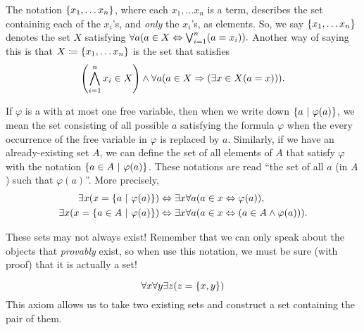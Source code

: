 \begin{definition}\label{not:setbuilder}
    The notation \(\set*{x_1, \dots x_n}\),
    where each \(x_1, \dots x_n\) is a term, 
    describes the set containing each of the \(x_i\)'s, and \emph{only} the \(x_i\)'s, as elements.
    So, we say \(\set*{x_1, \dots x_n}\) denotes the set \(X\) satisfying
    \(
        \forall a \pn*{a \in X \iff \bigjoin_{i = 1}^{n}\pn*{a = x_i}}.
    \)
    Another way of saying this is that \(X \defn \set*{x_1, \dots x_n}\) is the set that satisfies
    \[
        \pn*{\bigmeet_{i = 1}^{n}x_i \in X}
             \meet \forall a \pn*{a \in X \implies \pn*{\exists x \in X \pn*{a = x}}}.
    \]
\end{definition}

\begin{definition}
    If \(\varphi\) is a {\wff} with at most one free variable,
    then when we write down \(\set*{a \suchthat \varphi(a)}\),
    we mean the set consisting of all possible \(a\) satisfying the formula \(\varphi\)
    when the every occurrence of the free variable in \(\varphi\) is replaced by \(a\).
    Similarly, if we have an already-existing set \(A\),
    we can define the set of all elements of \(A\) that satisfy \(\varphi\)
    with the notation \(\set*{a \in A \suchthat \varphi(a)}\).
    These notations are read ``the set of all \(a\) (in \(A\)) such that \(\varphi(a)\)''.
    More precisely,
    \begin{align*}
        \exists x \pn*{x = \set*{a \suchthat \varphi(a)}}
            &\iff \exists x \forall a \pn*{a \in x \iff \varphi(a)},\\
        \exists x \pn*{x = \set*{a  \in A \suchthat \varphi(a)}}
            &\iff \exists x \forall a \pn*{a \in x \iff \pn*{a \in A \meet \varphi(a)}}.
    \end{align*}

    \begin{note}
        These sets may not always exist!
        Remember that we can only speak about the objects that \emph{provably} exist,
        so when use this notation,
        we must be sure (with proof) that it is actually a set!
    \end{note}
\end{definition}

\begin{axiom}[Pairing]\label{ax:pairing}
    \vspace{-\abovedisplayskip}
    \[\forall x \forall y \exists z \pn*{z = \set*{x, y}}\]
    This axiom allows us to take two existing sets and construct a set containing the pair of them.
\end{axiom}

